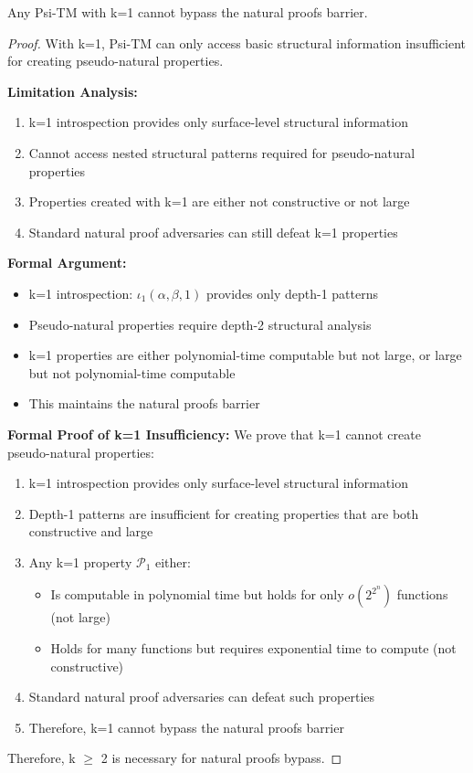 \documentclass[11pt]{article}
\begin{document}
\begin{theorem}
\label{thm:natural-proofs-k1}
Any Psi-TM with k=1 cannot bypass the natural proofs barrier.
\end{theorem}

\begin{proof}
With k=1, Psi-TM can only access basic structural information insufficient for creating pseudo-natural properties.

\textbf{Limitation Analysis:}
\begin{enumerate}
\item k=1 introspection provides only surface-level structural information
\item Cannot access nested structural patterns required for pseudo-natural properties
\item Properties created with k=1 are either not constructive or not large
\item Standard natural proof adversaries can still defeat k=1 properties
\end{enumerate}

\textbf{Formal Argument:}
\begin{itemize}
\item k=1 introspection: $\iota_1(\alpha, \beta, 1)$ provides only depth-1 patterns
\item Pseudo-natural properties require depth-2 structural analysis
\item k=1 properties are either polynomial-time computable but not large, or large but not polynomial-time computable
\item This maintains the natural proofs barrier
\end{itemize}

\textbf{Formal Proof of k=1 Insufficiency:}
We prove that k=1 cannot create pseudo-natural properties:
\begin{enumerate}
\item k=1 introspection provides only surface-level structural information
\item Depth-1 patterns are insufficient for creating properties that are both constructive and large
\item Any k=1 property $\mathcal{P}_1$ either:
  \begin{itemize}
  \item Is computable in polynomial time but holds for only $o(2^{2^n})$ functions (not large)
  \item Holds for many functions but requires exponential time to compute (not constructive)
  \end{itemize}
\item Standard natural proof adversaries can defeat such properties
\item Therefore, k=1 cannot bypass the natural proofs barrier
\end{enumerate}

Therefore, k $\geq$ 2 is necessary for natural proofs bypass.
\end{proof}
\end{document}
